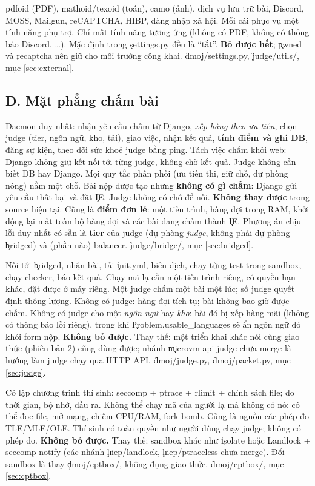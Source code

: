 {pdfoid (PDF), mathoid/texoid (toán), camo (ảnh), dịch vụ lưu trữ bài, Discord, MOSS, Mailgun, reCAPTCHA, HIBP, đăng nhập xã hội.}
{Mỗi cái phục vụ một tính năng phụ trợ.}
{Chỉ mất tính năng tương ứng (không có PDF, không có thông báo Discord, \ldots). Mặc định trong \c{settings.py} đều là ``tắt''.}
{\textbf{Bỏ được hết}; \c{pwned} và \c{recaptcha} nên giữ cho môi trường công khai.}
{\f{dmoj/settings.py}, \f{judge/utils/}, mục \ref{sec:external}.}

\subsection*{D. Mặt phẳng chấm bài}
{Daemon duy nhất: nhận yêu cầu chấm từ Django, \emph{xếp hàng theo ưu tiên}, chọn judge (tier, ngôn ngữ, kho, tải), giao việc, nhận kết quả, \textbf{tính điểm và ghi DB}, đăng sự kiện, theo dõi sức khoẻ judge bằng ping.}
{Tách việc chấm khỏi web: Django không giữ kết nối tới từng judge, không chờ kết quả. Judge không cần biết DB hay Django. Mọi quy tắc phân phối (ưu tiên thi, giữ chỗ, dự phòng nóng) nằm một chỗ.}
{Bài nộp được tạo nhưng \textbf{không có gì chấm}: Django gửi yêu cầu thất bại và đặt \c{IE}. Judge không có chỗ để nối.}
{\textbf{Không thay được} trong source hiện tại. Cũng là \textbf{điểm đơn lẻ}: một tiến trình, hàng đợi trong RAM, khởi động lại mất toàn bộ hàng đợi và các bài đang chấm thành \c{IE}. Phương án chịu lỗi duy nhất có sẵn là \textbf{tier} của judge (dự phòng \emph{judge}, không phải dự phòng \c{bridged}) và (phần nào) balancer.}
{\f{judge/bridge/}, mục \ref{sec:bridged}.}

{Nối tới \c{bridged}, nhận bài, tải \c{init.yml}, biên dịch, chạy từng test trong sandbox, chạy checker, báo kết quả.}
{Chạy mã lạ cần một tiến trình riêng, có quyền hạn khác, đặt được ở máy riêng. Một judge chấm một bài một lúc; số judge quyết định thông lượng.}
{Không có judge: hàng đợi tích tụ; bài không bao giờ được chấm. Không có judge cho một \emph{ngôn ngữ} hay \emph{kho}: bài đó bị xếp hàng mãi (không có thông báo lỗi riêng), trong khi \c{Problem.usable_languages} sẽ ẩn ngôn ngữ đó khỏi form nộp.}
{\textbf{Không bỏ được.} Thay thế: một triển khai khác nói cùng giao thức (phiên bản 2) cũng dùng được; nhánh \c{microvm-api-judge} chưa merge là hướng làm judge chạy qua HTTP API.}
{\f{dmoj/judge.py}, \f{dmoj/packet.py}, mục \ref{sec:judge}.}

{Cô lập chương trình thí sinh: seccomp + ptrace + rlimit + chính sách file; đo thời gian, bộ nhớ, đầu ra.}
{Không thể chạy mã của người lạ mà không có nó: có thể đọc file, mở mạng, chiếm CPU/RAM, fork-bomb. Cũng là nguồn các phép đo TLE/MLE/OLE.}
{Thí sinh có toàn quyền như người dùng chạy judge; không có phép đo.}
{\textbf{Không bỏ được.} Thay thế: sandbox khác như \c{isolate} hoặc Landlock + seccomp-notify (các nhánh \c{hiep/landlock}, \c{hiep/ptraceless} chưa merge). Đổi sandbox là thay \c{dmoj/cptbox/}, không đụng giao thức.}
{\f{dmoj/cptbox/}, mục \ref{sec:cptbox}.}

